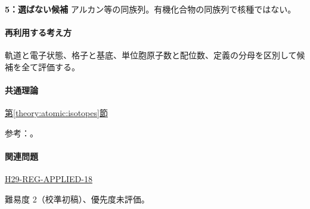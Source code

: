 \noindent\textbf{5：選ばない候補} アルカン等の同族列。有機化合物の同族列で核種ではない。\par

\paragraph{再利用する考え方} 軌道と電子状態、格子と基底、単位胞原子数と配位数、定義の分母を区別して候補を全て評価する。

\paragraph{共通理論} \hyperref[theory:atomic:isotopes]{第\ref*{theory:atomic:isotopes}節}

\par 参考：\cite{modern_mit_nuclear}。

\paragraph{関連問題} \hyperref[q:h29-reg-applied-18]{H29-REG-APPLIED-18}

\par 難易度 2（校準初稿）、優先度未評価。

